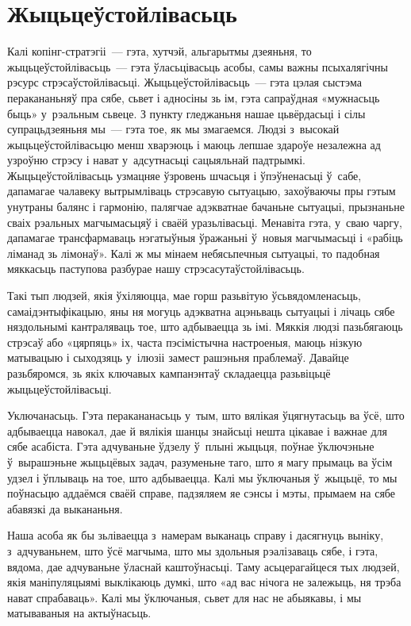 \section{Жыцьцеўстойлівасьць}

Калі копінг-стратэгіі~--- гэта, хутчэй, альгарытмы дзеяньня, то жыцьцеўстойлівасьць~--- гэта ўласьцівасьць асобы, самы важны псыхалягічны рэсурс стрэсаўстойлівасьці. Жыцьцеўстойлівасьць~--- гэта цэлая сыстэма перакананьняў пра сябе, сьвет і адносіны зь ім, гэта сапраўдная «мужнасьць быць» у~рэальным сьвеце. З пункту гледжаньня нашае цьвёрдасьці і сілы супрацьдзеяньня мы~--- гэта тое, як мы змагаемся. Людзі з~высокай жыцьцеўстойлівасьцю менш хварэюць і маюць лепшае здароўе незалежна ад узроўню стрэсу і нават у~адсутнасьці сацыяльнай падтрымкі. Жыцьцеўстойлівасьць узмацняе ўзровень шчасьця і ўпэўненасьці ў~сабе, дапамагае чалавеку вытрымліваць стрэсавую сытуацыю, захоўваючы пры гэтым унутраны балянс і гармонію, палягчае адэкватнае бачаньне сытуацыі, прызнаньне сваіх рэальных магчымасьцяў і сваёй уразьлівасьці. Менавіта гэта, у~сваю чаргу, дапамагае трансфармаваць нэгатыўныя ўражаньні ў~новыя магчымасьці і «рабіць ліманад зь лімонаў». Калі ж мы мінаем небясьпечныя сытуацыі, то падобная мяккасьць паступова разбурае нашу стрэсасутаўстойлівасьць.

Такі тып людзей, якія ўхіляюцца, мае горш разьвітую ўсьвядомленасьць, самаідэнтыфікацыю, яны ня могуць адэкватна ацэньваць сытуацыі і лічаць сябе няздольнымі кантраляваць тое, што адбываецца зь імі. Мяккія людзі пазьбягаюць стрэсаў або «цярпяць» іх, часта пэсімістычна настроеныя, маюць нізкую матывацыю і сыходзяць у~ілюзіі замест рашэньня праблемаў. Давайце разьбяромся, зь якіх ключавых кампанэнтаў складаецца разьвіцьцё жыцьцеўстойлівасьці.

Уключанасьць. Гэта перакананасьць у~тым, што вялікая ўцягнутасьць ва ўсё, што адбываецца навокал, дае й вялікія шанцы знайсьці нешта цікавае і важнае для сябе асабіста. Гэта адчуваньне ўдзелу ў~плыні жыцьця, поўнае ўключэньне ў~вырашэньне жыцьцёвых задач, разуменьне таго, што я магу прымаць ва ўсім удзел і ўплываць на тое, што адбываецца. Калі мы ўключаныя ў~жыцьцё, то мы поўнасьцю аддаёмся сваёй справе, падзяляем яе сэнсы і мэты, прымаем на сябе абавязкі да выкананьня. 

Наша асоба як бы зьліваецца з~намерам выканаць справу і дасягнуць выніку, з~адчуваньнем, што ўсё магчыма, што мы здольныя рэалізаваць сябе, і гэта, вядома, дае адчуваньне ўласнай каштоўнасьці. Таму асьцерагайцеся тых людзей, якія маніпуляцыямі выклікаюць думкі, што «ад вас нічога не залежыць, ня трэба нават спрабаваць». Калі мы ўключаныя, сьвет для нас не абыякавы, і мы матываваныя на актыўнасьць.

